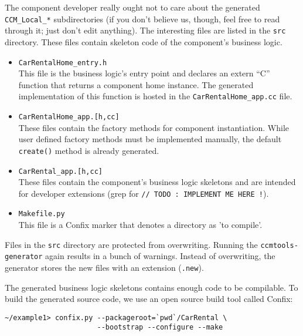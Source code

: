 The component developer really ought not to care about the generated {\tt CCM\_Local\_*}
subdirectories (if you don't believe us, though, feel free to read
through it; just don't edit anything). 
The interesting files are listed in the {\tt src} directory. These files contain skeleton
code of the component's business logic.

\begin{itemize}
\item {\tt CarRentalHome\_entry.h} \\
This file is the business logic's entry point and declares an extern ``C'' function 
that returns a component home instance.
The generated implementation of this function is hosted in the 
{\tt CarRentalHome\_app.cc} file.

\item {\tt CarRentalHome\_app.[h,cc]} \\
These files contain the factory methods for component instantiation. 
While user defined factory methods must be implemented manually, the default 
{\tt create()} method is already generated.

\item {\tt CarRental\_app.[h,cc]} \\
These files contain the component's business logic skeletons and are intended
for developer extensions (grep for {\tt // TODO : IMPLEMENT ME HERE !}).

\item {\tt Makefile.py} \\
This file is a Confix marker that denotes a directory as 'to compile'.
\end{itemize}

Files in the {\tt src} directory are protected from overwriting.
Running the {\tt ccmtools-generator} again results in a bunch of warnings. 
Instead of overwriting, the generator stores the new files with an extension ({\tt *.new}). 

\vspace{3mm}
The generated business logic skeletons contains enough code to be compilable.
To build the generated source code, we use an open source build tool called Confix:
\begin{small}
\begin{verbatim}
~/example1> confix.py --packageroot=`pwd`/CarRental \
                      --bootstrap --configure --make
\end{verbatim}
\end{small}


